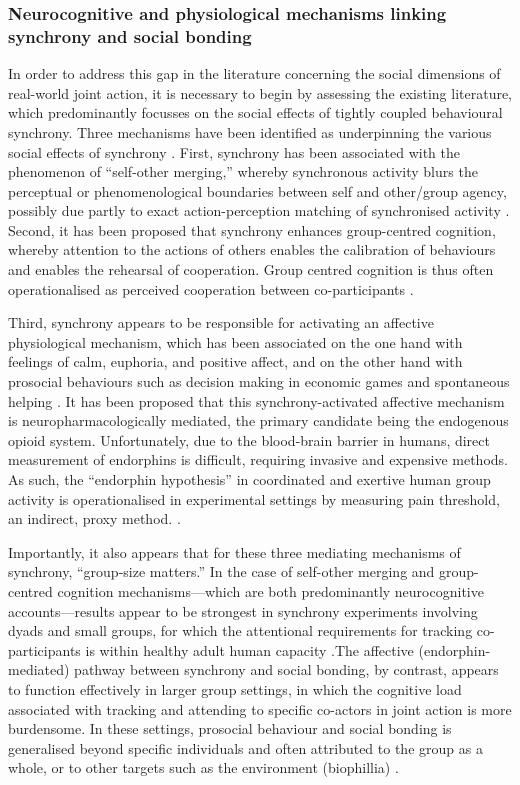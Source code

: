 \begin{CJK}{UTF8}{gbsn}
{\subsubsection{Neurocognitive and physiological mechanisms linking synchrony and social bonding}
In order to address this gap in the literature concerning the social dimensions of real-world joint action, it is necessary to begin by assessing the existing literature, which predominantly focusses on the social effects of tightly coupled behavioural synchrony. Three mechanisms have been identified as underpinning the various social effects of synchrony \citep{Lang2017,Mogan2017}.  First, synchrony has been associated with the phenomenon of ``self-other merging,'' whereby synchronous activity blurs the perceptual or phenomenological boundaries between self and other/group agency, possibly due partly to exact action-perception matching of synchronised activity \citep{Hove2008}.  Second, it has been proposed that synchrony enhances group-centred cognition, whereby attention to the actions of others enables the calibration of behaviours and enables the rehearsal of cooperation. Group centred cognition is thus often operationalised as perceived cooperation between co-participants \citep{Reddish2013}.

Third, synchrony appears to be responsible for activating an affective physiological mechanism, which has been associated on the one hand with feelings of calm, euphoria, and positive affect, and on the other hand with prosocial behaviours such as decision making in economic games and spontaneous helping \citep{Wiltermuth2009,Reddish2013a,Mogan2017}.
It has been proposed that this synchrony-activated affective mechanism is neuropharmacologically mediated, the primary candidate being the endogenous opioid system.  Unfortunately, due to the blood-brain barrier in humans, direct measurement of endorphins is difficult, requiring invasive and expensive methods.  As such, the ``endorphin hypothesis'' in coordinated and exertive human group activity is operationalised in experimental settings by measuring pain threshold, an indirect, proxy method. \citep{Dunbar2008,Sullivan2013,Sullivan2014,Tarr2015}.

Importantly, it also appears that for these three mediating mechanisms of synchrony, ``group-size matters.'' In the case of self-other merging and group-centred cognition mechanisms---which are both predominantly neurocognitive accounts---results appear to be strongest in synchrony experiments involving dyads and small groups, for which the attentional requirements for tracking co-participants is within healthy adult human capacity \citep{Mogan2017}.The affective (endorphin-mediated) pathway between synchrony and social bonding, by contrast, appears to function effectively in larger group settings, in which the cognitive load associated with tracking and attending to specific co-actors in joint action is more burdensome.  In these settings, prosocial behaviour and social bonding is generalised beyond specific individuals and often attributed to the group as a whole, or to other targets such as the environment (biophillia) \citep{Reddish2013b, Reddish2016}.

}
\end{CJK}
